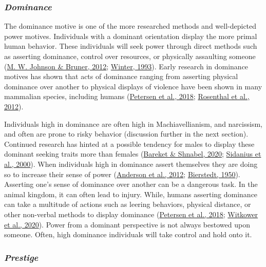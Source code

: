 \documentclass[
  donotrepeattitle,doc, 12pt, a4paper,floatsintext]{apa7}
\begin{document}
\hypertarget{dominance}{%
\subsubsection{\texorpdfstring{\emph{Dominance}}{Dominance}}\label{dominance}}

The dominance motive is one of the more researched methods and well-depicted power motives. Individuals with a dominant orientation display the more primal human behavior. These individuals will seek power through direct methods such as asserting dominance, control over resources, or physically assaulting someone (\protect\hyperlink{ref-johnson2012}{M. W. Johnson \& Bruner, 2012}; \protect\hyperlink{ref-winter1993}{Winter, 1993}). Early research in dominance motives has shown that acts of dominance ranging from asserting physical dominance over another to physical displays of violence have been shown in many mammalian species, including humans (\protect\hyperlink{ref-petersen2018}{Petersen et al., 2018}; \protect\hyperlink{ref-rosenthal2012}{Rosenthal et al., 2012}).

Individuals high in dominance are often high in Machiavellianism, and narcissism, and often are prone to risky behavior (discussion further in the next section). Continued research has hinted at a possible tendency for males to display these dominant seeking traits more than females (\protect\hyperlink{ref-bareket2020}{Bareket \& Shnabel, 2020}; \protect\hyperlink{ref-sidanius2000}{Sidanius et al., 2000}). When individuals high in dominance assert themselves they are doing so to increase their sense of power (\protect\hyperlink{ref-anderson2012}{Anderson et al., 2012}; \protect\hyperlink{ref-bierstedt1950}{Bierstedt, 1950}). Asserting one's sense of dominance over another can be a dangerous task. In the animal kingdom, it can often lead to injury. While, humans asserting dominance can take a multitude of actions such as leering behaviors, physical distance, or other non-verbal methods to display dominance (\protect\hyperlink{ref-petersen2018}{Petersen et al., 2018}; \protect\hyperlink{ref-witkower2020}{Witkower et al., 2020}). Power from a dominant perspective is not always bestowed upon someone. Often, high dominance individuals will take control and hold onto it.

\hypertarget{prestige}{%
\subsubsection{\texorpdfstring{\emph{Prestige}}{Prestige}}\label{prestige}}
\end{document}
